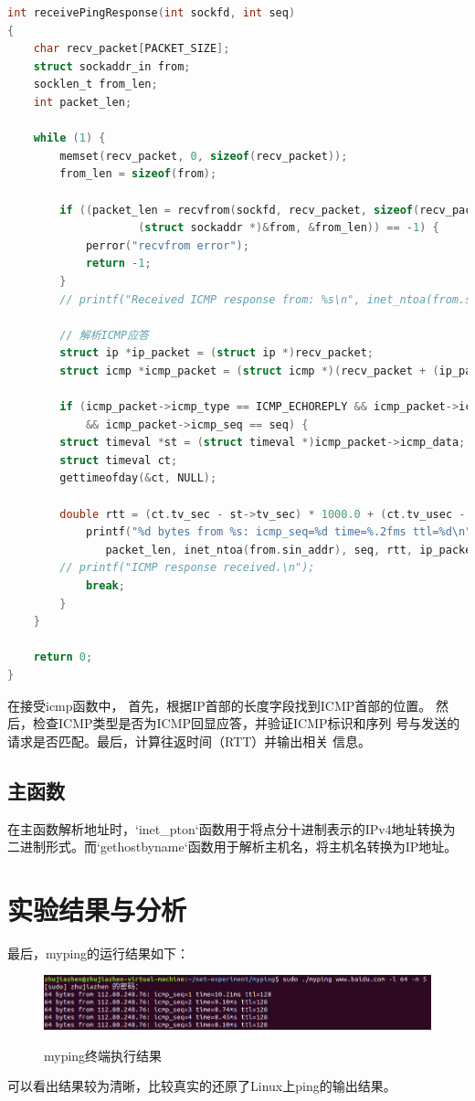 \documentclass[12pt]{ctexart}
\begin{document}
    \begin{lstlisting}[language = C]
int receivePingResponse(int sockfd, int seq)
{
    char recv_packet[PACKET_SIZE];
    struct sockaddr_in from;
    socklen_t from_len;
    int packet_len;

    while (1) {
        memset(recv_packet, 0, sizeof(recv_packet));
        from_len = sizeof(from);

        if ((packet_len = recvfrom(sockfd, recv_packet, sizeof(recv_packet), 0, 
                    (struct sockaddr *)&from, &from_len)) == -1) {
            perror("recvfrom error");
            return -1;
        }
        // printf("Received ICMP response from: %s\n", inet_ntoa(from.sin_addr));

        // 解析ICMP应答
        struct ip *ip_packet = (struct ip *)recv_packet;
        struct icmp *icmp_packet = (struct icmp *)(recv_packet + (ip_packet->ip_hl << 2));

        if (icmp_packet->icmp_type == ICMP_ECHOREPLY && icmp_packet->icmp_id == getpid()
            && icmp_packet->icmp_seq == seq) {
        struct timeval *st = (struct timeval *)icmp_packet->icmp_data;
        struct timeval ct;
        gettimeofday(&ct, NULL);

        double rtt = (ct.tv_sec - st->tv_sec) * 1000.0 + (ct.tv_usec - st->tv_usec) / 1000.0;
            printf("%d bytes from %s: icmp_seq=%d time=%.2fms ttl=%d\n",
               packet_len, inet_ntoa(from.sin_addr), seq, rtt, ip_packet->ip_ttl);
        // printf("ICMP response received.\n");
            break;
        }
    }

    return 0;
}
    \end{lstlisting}

    在接受icmp函数中，
    首先，根据IP首部的长度字段找到ICMP首部的位置。
    然后，检查ICMP类型是否为ICMP回显应答，并验证ICMP标识和序列
    号与发送的请求是否匹配。最后，计算往返时间（RTT）并输出相关
    信息。

    \subsection{主函数}

    在主函数解析地址时，`inet\_pton`函数用于将点分十进制表示的IPv4地址转换为二进制形式。而`gethostbyname`函数用于解析主机名，将主机名转换为IP地址。

    \section{实验结果与分析}

    最后，myping的运行结果如下：

    \begin{figure}[H]
        \centering
        \includegraphics[width=5in]{figures/res.png}
        \label{rw}
        \caption{myping终端执行结果}
    \end{figure}

    可以看出结果较为清晰，比较真实的还原了Linux上ping的输出结果。
\end{document}
